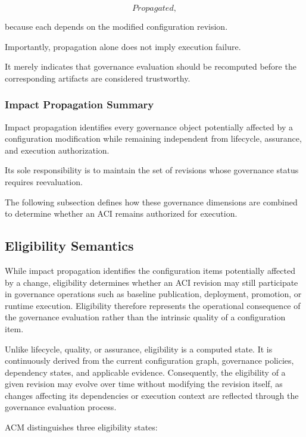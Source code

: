 \documentclass[10pt]{article}
\begin{document}
\[
Propagated,
\]

because each depends on the modified configuration revision.

Importantly, propagation alone does not imply execution failure.

It merely indicates that governance evaluation should be recomputed before the
corresponding artifacts are considered trustworthy.

\subsubsection{Impact Propagation Summary}

Impact propagation identifies every governance object potentially affected by a
configuration modification while remaining independent from lifecycle,
assurance, and execution authorization.

Its sole responsibility is to maintain the set of revisions whose governance
status requires reevaluation.

The following subsection defines how these governance dimensions are combined
to determine whether an ACI remains authorized for execution.

\subsection{Eligibility Semantics}
\label{subsec:eligibility}

While impact propagation identifies the configuration items potentially affected by a change, eligibility determines whether an ACI revision may still participate in governance operations such as baseline publication, deployment, promotion, or runtime execution. Eligibility therefore represents the operational consequence of the governance evaluation rather than the intrinsic quality of a configuration item.

Unlike lifecycle, quality, or assurance, eligibility is a computed state. It is continuously derived from the current configuration graph, governance policies, dependency states, and applicable evidence. Consequently, the eligibility of a given revision may evolve over time without modifying the revision itself, as changes affecting its dependencies or execution context are reflected through the governance evaluation process.

ACM distinguishes three eligibility states:
\end{document}
